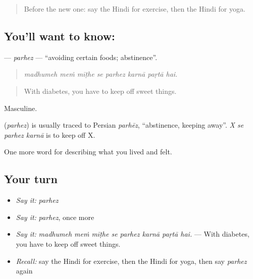 \label{lesson:HI-C495-parhez}



\begin{quote}
Before the new one: say the Hindi for exercise, then the Hindi for yoga.
\end{quote}

\subsection*{You'll want to know: }
\textbf{} — \emph{parhez} — \textquotedblleft{}avoiding certain foods; abstinence\textquotedblright{}.

\begin{quote}
       
\end{quote}

\begin{quote}
\emph{madhumeh meṁ mīṭhe se parhez karnā paṛtā hai.}
\end{quote}

\begin{quote}
With diabetes, you have to keep off sweet things.
\end{quote}

Masculine.

\begin{cousinweb}
\textbf{} (\emph{parhez}) is usually traced to Persian \emph{parhēz}, \textquotedblleft{}abstinence, keeping away\textquotedblright{}. \emph{X se parhez karnā} is to keep off X.
\end{cousinweb}

\begin{grammarlens}[title={What you've built}]
One more word for describing what you lived and felt.
\end{grammarlens}

\subsection*{Your turn}
\begin{itemize}
\raggedright
  \item \emph{Say it:} \emph{parhez}
  \item \emph{Say it:} \emph{parhez}, once more
  \item \emph{Say it:} \emph{madhumeh meṁ mīṭhe se parhez karnā paṛtā hai.} — With diabetes, you have to keep off sweet things.
  \item \emph{Recall:} say the Hindi for exercise, then the Hindi for yoga, then say \emph{parhez} again
\end{itemize}

